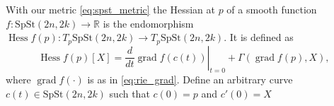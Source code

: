 With our metric \ref{eq:spst_metric} the Hessian at $p$ of a smooth function $f:\mathrm{SpSt}(2n, 2k)\xrightarrow{}\mathbb{R}$ is the endomorphism $\operatorname{Hess}f(p):T_{p}\mathrm{SpSt}(2n, 2k)\xrightarrow{}T_{p}\mathrm{SpSt}(2n, 2k)$. It is defined as
\begin{equation*}
    \operatorname{Hess}f(p)[X]=\left.\frac{d}{dt}\operatorname{grad}f(c(t))\right|_{t=0}+\Gamma(\operatorname{grad}f(p),X),
\end{equation*}
where $\operatorname{grad}f(\cdot)$ is as in \ref{eq:rie_grad}. Define an arbitrary curve $c(t)\in \mathrm{SpSt}(2n, 2k)$ such that $c(0)=p$ and $c'(0)=X$ %